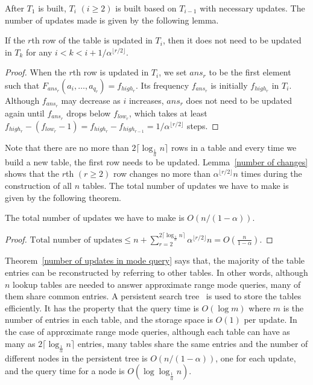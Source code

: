 \documentclass{llncs}
\begin{document}
After $T_1$ is built,  $T_i$ $(i\ge 2)$ is built based on $T_{i-1}$
with necessary updates. The number of updates made is given by the 
following lemma.

\begin{lemma}
\label{number of changes}
If the $r$th row of the table is updated in $T_{i}$, then it does not need to be updated 
in $T_{k}$ for any $i<k<i+1/\alpha^{\lfloor r/2 \rfloor}$.
\end{lemma}
\begin{proof}
When the $r$th row is updated in $T_{i}$, we set $ans_r$ to be the first element such that 
$F_{ans_r}(a_i, \ldots, a_{q_r}) = f_{high_r}$. Its frequency $f_{ans_r}$ is initially $f_{high_r}$ in $T_{i}$. 
Although $f_{ans_r}$ may decrease as $i$ increases, $ans_r$ does not need to be 
updated again until $f_{ans_r}$ drops below $f_{low_r}$, which takes at least 
$f_{high_r} - (f_{low_r} - 1) = f_{high_r} - f_{high_{r-1}} = 1/\alpha^{\lfloor r/2 \rfloor}$ 
steps.
\end{proof}

Note that there are no more than $2\lceil \log_{\frac{1}{\alpha}} n \rceil$ rows in a table and every time we 
build a new table, the first row needs to be updated. Lemma~\ref{number of changes} 
shows that the $r$th $(r \ge 2)$ row changes no more than $\alpha^{\lfloor r/2 \rfloor} n$ times 
during the construction of all $n$ tables.  
The total number of updates we have to make 
is given by the following theorem.

\begin{theorem}\label{number of updates in mode query}
The total number of updates we have to make is $O(n/(1-\alpha))$.
\end{theorem}
\begin{proof} $\mbox{Total number of updates} \leq n + 
\sum_{r=2}^{2 \lceil \log_{\frac{1}{\alpha}} n\rceil}{\alpha^{\lfloor r/2 \rfloor} n}
                                 =   O(\frac{n}{1-\alpha})$.
\end{proof}

Theorem~\ref{number of updates in mode query} says that, the majority of the table entries
can be reconstructed by referring to other tables. In other words,
although $n$ lookup tables are needed to answer approximate range mode queries, many of them
share common entries. A persistent search tree~\cite{dsst89} is used to store the tables 
efficiently. It has the property that 
the query time is $O(\log m)$ where $m$ is the number of entries in each table, 
and the storage space is $O(1)$ per update. In the case of approximate range mode 
queries, although each table can have as many as
$2\lceil\log_{\frac{1}{\alpha}} n \rceil$ entries, many tables share
the same entries and the number of different nodes in the persistent tree 
is $O(n/(1-\alpha))$, one for each update, and the query 
time for a node is $O(\log\log_{\frac{1}{\alpha}}{n})$. 
\end{document}
